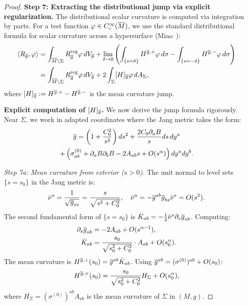 \begin{proof}
\textbf{Step 7: Extracting the distributional jump via explicit regularization.}
The distributional scalar curvature is computed via integration by parts. For a test function $\varphi \in C^\infty_c(\overline{M})$, we use the standard distributional formula for scalar curvature across a hypersurface (Miao~\cite{miao2002}):
\begin{align}
    \langle R_{\overline{g}}, \varphi \rangle &= \int_{\overline{M} \setminus \Sigma} R_{\overline{g}}^{\text{reg}} \varphi \, dV_{\overline{g}} + \lim_{\delta \to 0} \left( \int_{\{s=\delta\}} H^{\overline{g},+} \varphi \, d\sigma - \int_{\{s=-\delta\}} H^{\overline{g},-} \varphi \, d\sigma \right) \nonumber\\
    &= \int_{\overline{M} \setminus \Sigma} R_{\overline{g}}^{\text{reg}} \varphi \, dV_{\overline{g}} + 2 \int_\Sigma [H]_{\overline{g}} \varphi \, dA_\Sigma, \label{eq:DistrScalar-deriv}
\end{align}
where $[H]_{\overline{g}} := H^{\overline{g},+} - H^{\overline{g},-}$ is the mean curvature jump.

\textbf{Explicit computation of $[H]_{\overline{g}}$.} We now derive the jump formula rigorously. Near $\Sigma$, we work in adapted coordinates where the Jang metric takes the form:
\begin{multline}\label{eq:JangMetricNearSigma}
    \overline{g} = \left(1 + \frac{C_0^2}{s^2}\right) ds^2 + \frac{2C_0 \partial_a B}{s} ds \, dy^a \\
    + \left(\sigma_{ab}^{(0)} + \partial_a B \partial_b B - 2A_{ab} s + O(s^\alpha)\right) dy^a dy^b.
\end{multline}

\textit{Step 7a: Mean curvature from exterior ($s > 0$).}
The unit normal to level sets $\{s = s_0\}$ in the Jang metric is:
\begin{equation}\label{eq:UnitNormalExplicit}
    \bar{\nu}^s = \frac{1}{\sqrt{\overline{g}_{ss}}} = \frac{s}{\sqrt{s^2 + C_0^2}}, \quad \bar{\nu}^a = -\overline{g}^{ab} \overline{g}_{bs} \bar{\nu}^s = O(s^2).
\end{equation}
The second fundamental form of $\{s = s_0\}$ is $\bar{K}_{ab} = -\frac{1}{2}\bar{\nu}^s \partial_s \overline{g}_{ab}$. Computing:
\begin{align}
    \partial_s \overline{g}_{ab} &= -2A_{ab} + O(s^{\alpha-1}), \nonumber\\
    \bar{K}_{ab} &= \frac{s_0}{\sqrt{s_0^2 + C_0^2}} \cdot A_{ab} + O(s_0^\alpha). \label{eq:SecondFFExplicit}
\end{align}
The mean curvature is $H^{\overline{g},+}(s_0) = \overline{g}^{ab} \bar{K}_{ab}$. Using $\overline{g}^{ab} = (\sigma^{(0)})^{ab} + O(s_0)$:
\begin{equation}\label{eq:ExtMCExplicit}
    H^{\overline{g},+}(s_0) = \frac{s_0}{\sqrt{s_0^2 + C_0^2}} H_\Sigma + O(s_0^\alpha),
\end{equation}
where $H_\Sigma = (\sigma^{(0)})^{ab} A_{ab}$ is the mean curvature of $\Sigma$ in $(M,g)$.


\end{proof}
